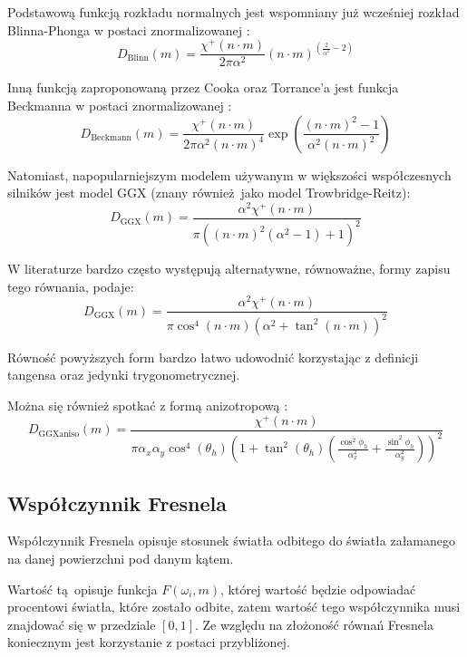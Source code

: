 \documentclass[../main.tex]{subfiles}
\begin{document}
Podstawową funkcją rozkładu normalnych jest wspomniany już wcześniej rozkład
Blinna-Phonga w postaci znormalizowanej \cite{SpecularBRDFReference}:
\[
  D_{\text{Blinn}}(m) =
    \frac{\chi^{+}(n \cdot m)}{2\pi\alpha^2}
    (n \cdot m)^{(\frac{2}{\alpha^2} - 2)}
\]

Inną funkcją zaproponowaną przez Cooka oraz Torrance'a jest funkcja Beckmanna \cite{CookTorrance} w postaci znormalizowanej \cite{pbr_background}:
\[
  D_{\text{Beckmann}}(m) =
    \frac{\chi^{+}(n \cdot m)}{2\pi\alpha^2 (n \cdot m)^{4}}
    \exp\left(
      \frac{
        (n \cdot m)^2 - 1
      }{
        \alpha^2 (n \cdot m)^2
      }
    \right)
\]

Natomiast, napopularniejszym modelem używanym w większości współczesnych silników jest model GGX (znany również jako model Trowbridge-Reitz):
\[
  D_{\text{GGX}}(m) =
    \frac{
      \alpha^2 \chi^{+}(n \cdot m)
    }{
      \pi \left(
        \left(n \cdot m \right)^{2}
        \left(\alpha^2 - 1 \right)
        + 1
      \right)^2
    }
\]

W literaturze bardzo często występują alternatywne, równoważne, formy zapisu
tego równania, \cite{WalterMicrofacetModels} podaje:
\[
  D_{\text{GGX}}(m) =
    \frac{\alpha^2 \chi^{+}(n \cdot m)}{
      \pi \cos^{4} (n \cdot m) \left( \alpha^2 + \tan^2 (n \cdot m) \right)^2
    }
\]

\noindent Równość powyższych form bardzo łatwo udowodnić korzystając z
definicji tangensa oraz jedynki trygonometrycznej.

Można się również spotkać z formą anizotropową \cite{pbrt}:
\[
  D_{\text{GGXaniso}}(m) =
    \frac{\chi^{+}(n \cdot m)}{
      \pi \alpha_x \alpha_y \cos^{4} (\theta_h) \left(
        1 + \tan^{2}(\theta_h) \left(
          \frac{\cos^{2}{\phi_h}}{\alpha_{x}^{2}} +
          \frac{\sin^{2}{\phi_h}}{\alpha_{y}^{2}}
        \right)
      \right)^{2}
    }
\]

\subsection{Współczynnik Fresnela}

Współczynnik Fresnela opisuje stosunek światła odbitego do światła załamanego
na danej powierzchni pod danym kątem.

Wartość tą opisuje funkcja $F(\omega_i,m)$, której wartość będzie odpowiadać
procentowi światła, które zostało odbite, zatem wartość tego współczynnika musi
znajdować się w przedziale $[0,1]$. Ze względu na złożoność równań Fresnela
koniecznym jest korzystanie z postaci przybliżonej. 
\end{document}
